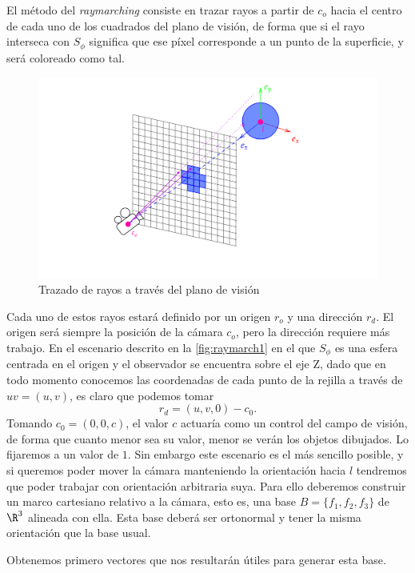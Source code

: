 El método del \textit{raymarching} consiste en trazar rayos a partir de $c_o$ hacia el centro de cada uno de los cuadrados del plano de visión, de forma que si el rayo interseca con $S_\phi$ significa que ese píxel corresponde a un punto de la superficie, y será coloreado como tal.
\begin{figure}[h]
    \centering
    \includegraphics[width=\textwidth]{Plantilla-TFG-master/img/raymarch_fix.png}
    \caption{Trazado de rayos a través del plano de visión}
    \label{fig:raymarch1}
\end{figure}
\newline

Cada uno de estos rayos estará definido por un origen $r_o$ y una dirección $r_d$. El origen será siempre la posición de la cámara $c_o$, pero la dirección requiere más trabajo. En el escenario descrito en la \autoref{fig:raymarch1} en el que $S_{\phi}$ es una esfera centrada en el origen y el observador se encuentra sobre el eje Z, dado que en todo momento conocemos las coordenadas de cada punto de la rejilla a través de $uv = (u,v)$, es claro que podemos tomar
$$r_d = (u,v,0) - c_0.$$ 
Tomando $c_0 = (0,0,c)$, el valor $c$ actuaría como un control del campo de visión, de forma que cuanto menor sea su valor, menor se verán los objetos dibujados. Lo fijaremos a un valor de $1$. Sin embargo este escenario es el más sencillo posible, y si queremos poder mover la cámara manteniendo la orientación hacia $l$ tendremos que poder trabajar con  orientación arbitraria suya. Para ello deberemos construir un marco cartesiano relativo a la cámara, esto es, una base $B=\{f_1,f_2,f_3\}$ de $\R^3$ alineada con ella. Esta base deberá ser ortonormal y tener la misma orientación que la base usual. 

Obtenemos primero vectores que nos resultarán útiles para generar esta base.

